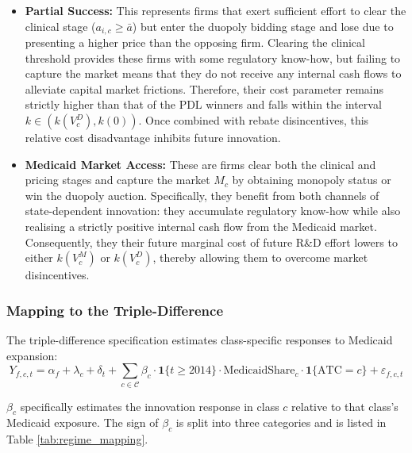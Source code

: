 \documentclass[12pt]{article}
\begin{document}
\begin{itemize}
    \item \textbf{Partial Success:} This represents firms that exert sufficient effort to clear the clinical stage ($a_{i,c} \ge \bar{a}$) but enter the duopoly bidding stage and lose due to presenting a higher price than the opposing firm. Clearing the clinical threshold provides these firms with some regulatory know-how, but failing to capture the market means that they do not receive any internal cash flows to alleviate capital market frictions. Therefore, their cost parameter remains strictly higher than that of the PDL winners and falls within the interval $k \in \left( k(V_c^D), k(0)\right)$. Once combined with rebate disincentives, this relative cost disadvantage inhibits future innovation.

    \item \textbf{Medicaid Market Access:} These are firms clear both the clinical and pricing stages and capture the market $M_c$ by obtaining monopoly status or win the duopoly auction. Specifically, they benefit from both channels of state-dependent innovation: they accumulate regulatory know-how while also realising a strictly positive internal cash flow from the Medicaid market. Consequently, they their future marginal cost of future R\&D effort lowers to either $k(V_c^M)$ or $k(V_c^D)$, thereby allowing them to overcome market disincentives.
\end{itemize}

\subsubsection{Mapping to the Triple-Difference} \label{sec:rq3_mapping}

The triple-difference specification estimates class-specific responses to Medicaid expansion:
\begin{equation}
    Y_{f,c,t} = \alpha_f + \lambda_c + \delta_t + \sum_{c \in \mathcal{C}} \beta_c \cdot \mathbf{1}\{t \geq 2014\} \cdot \text{MedicaidShare}_c \cdot \mathbf{1}\{\text{ATC} = c\} + \varepsilon_{f,c,t}
\end{equation}

$\beta_c$ specifically estimates the innovation response in class $c$ relative to that class's Medicaid exposure. The sign of $\beta_c$ is split into three categories and is listed in Table \ref{tab:regime_mapping}.
\end{document}
